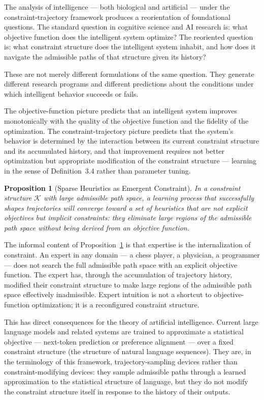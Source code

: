 \documentclass[12pt, twoside]{article}
\theoremstyle{plain}
\newtheorem{proposition}[theorem]{Proposition}
\theoremstyle{definition}
\theoremstyle{remark}
\begin{document}
The analysis of intelligence — both biological and artificial —
under the constraint-trajectory framework produces a reorientation
of foundational questions.
The standard question in cognitive science and AI research is:
what objective function does the intelligent system optimize?
The reoriented question is: what constraint structure does the
intelligent system inhabit, and how does it navigate the admissible
paths of that structure given its history?

These are not merely different formulations of the same question.
They generate different research programs and different predictions
about the conditions under which intelligent behavior succeeds or fails.

The objective-function picture predicts that an intelligent system
improves monotonically with the quality of the objective function
and the fidelity of the optimization.
The constraint-trajectory picture predicts that the system's behavior
is determined by the interaction between its current constraint structure
and its accumulated history, and that improvement requires not better
optimization but appropriate modification of the constraint structure
— learning in the sense of Definition~3.4 rather than parameter tuning.

\begin{proposition}[Sparse Heuristics as Emergent Constraint]
\label{prop:heuristics}
In a constraint structure $\mathcal{K}$ with large admissible path space,
a learning process that successfully shapes trajectories will converge
toward a set of heuristics that are not explicit objectives but
implicit constraints: they eliminate large regions of the admissible
path space without being derived from an objective function.
\end{proposition}

The informal content of Proposition~\ref{prop:heuristics} is that
expertise is the internalization of constraint.
An expert in any domain — a chess player, a physician, a programmer —
does not search the full admissible path space with an explicit
objective function.
The expert has, through the accumulation of trajectory history,
modified their constraint structure to make large regions of the
admissible path space effectively inadmissible.
Expert intuition is not a shortcut to objective-function optimization;
it is a reconfigured constraint structure.

This has direct consequences for the theory of artificial intelligence.
Current large language models and related systems are trained to
approximate a statistical objective — next-token prediction or
preference alignment — over a fixed constraint structure
(the structure of natural language sequences).
They are, in the terminology of this framework, trajectory-sampling
devices rather than constraint-modifying devices:
they sample admissible paths through a learned approximation to
the statistical structure of language, but they do not modify
the constraint structure itself in response to the history of their
outputs.
\end{document}
